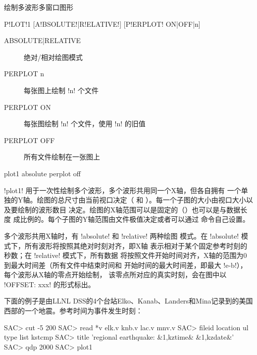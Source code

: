 \label{cmd:plot1}

绘制多波形多窗口图形

\begin{SACSTX}
P!LOT!1 [A!BSOLUTE!|R!ELATIVE!] [P!ERPLOT! ON|OFF|n]
\end{SACSTX}

\begin{description}
\item [ABSOLUTE|RELATIVE] 绝对/相对绘图模式
\item [PERPLOT n] 每张图上绘制 !n! 个文件
\item [PERPLOT ON] 每张图绘制 !n! 个文件，使用 !n! 的旧值
\item [PERPLOT OFF] 所有文件绘制在一张图上
\end{description}

\begin{SACDFT}
plot1 absolute perplot off
\end{SACDFT}

!plot1! 用于一次性绘制多个波形，多个波形共用同一个X轴，但各自拥有
一个单独的Y轴。绘图的总尺寸由当前视口决定（ 和
）。每一个子图的大小由视口大小以及要绘制的波形数目
决定。绘图的X轴范围可以是固定的（）也可以是与数据长度
成比例的。每个子图的Y轴范围由文件极值决定或者可以通过 
命令自己设置。

多个波形共用X轴时，有 !absolute! 和 !relative! 两种绘图
模式。在 !absolute! 模式下，所有波形将按照其绝对时刻对齐，即X轴
表示相对于某个固定参考时刻的秒数；在 !relative! 模式下，所有数据
将按照文件开始时间对齐，X轴的范围为0到最大时间差（所有文件中结束时间和
开始时间的最大时间差，即最大 !e-b!），每个波形从X轴的零点开始绘制，
该零点所对应的真实时刻，会在图中以 !OFFSET: xxx! 的形式标出。

下面的例子是由LLNL DSS的4个台站Elko、Kanab、Landers和Mina记录到的美国
西部的一个地震。参考时间为事件发生时刻：
\begin{SACCode}
SAC> cut -5 200
SAC> read *v
 elk.v knb.v lac.v mnv.v
SAC> fileid location ul type list kstcmp
SAC> title 'regional earthquake:  &1,kztime&  &1,kzdate&'
SAC> qdp 2000
SAC> plot1
\end{SACCode}
